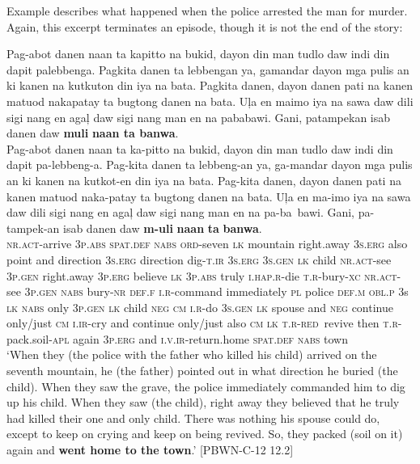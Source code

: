 Example  describes what happened when the police arrested the man for murder. Again, this excerpt terminates an episode, though it is not the end of the story:

\ea
\label{ex:tothetown}
Pag-abot danen naan ta kapitto na bukid, dayon din man tudlo daw indi din dapit palebbenga. Pagkita danen ta lebbengan ya, gamandar dayon mga pulis an ki kanen na kutkuton din iya na bata. Pagkita danen, dayon danen pati na kanen matuod nakapatay ta bugtong danen na bata. Uļa en maimo iya na sawa daw dili sigi nang en agaļ daw sigi nang man en na pababawi. Gani, patampekan isab danen daw \textbf{muli} \textbf{naan ta banwa}.\\\smallskip
\gll Pag-abot danen naan ta ka-pitto na bukid, dayon din man tudlo daw indi din dapit
pa-lebbeng-a. Pag-kita danen ta lebbeng-an ya, ga-mandar dayon mga pulis an ki kanen na
kutkot-en din iya na bata. Pag-kita danen, dayon danen pati na kanen matuod naka-patay ta
bugtong danen na bata. Uļa en ma-imo iya na sawa daw dili sigi nang en agaļ daw sigi nang man en na pa-ba~bawi. Gani, pa-tampek-an isab danen daw \textbf{m-uli} \textbf{naan}
\textbf{ta} \textbf{banwa}. \\
\textsc{nr.act}-arrive 3\textsc{p.abs} \textsc{spat.def} \textsc{nabs} \textsc{ord}-seven \textsc{lk} mountain right.away 3\textsc{s.erg} also point and direction 3\textsc{s.erg} direction
dig-\textsc{t.ir} 3\textsc{s.erg} 3\textsc{s.gen} \textsc{lk} child \textsc{nr.act}-see 3\textsc{p.gen} right.away 3\textsc{p.erg}  believe \textsc{lk} 3\textsc{p.abs} truly \textsc{i.hap.r}-die
\textsc{t.r}-bury-\textsc{xc} \textsc{nr.act}-see 3\textsc{p.gen} \textsc{nabs} bury-\textsc{nr} \textsc{def.f} \textsc{i.r}-command immediately \textsc{pl} police \textsc{def.m} \textsc{obl.p} 3s \textsc{lk}
\textsc{nabs} only 3\textsc{p.gen} \textsc{lk} child \textsc{neg} \textsc{cm} \textsc{i.r}-do 3\textsc{s.gen} \textsc{lk} spouse and \textsc{neg} continue only/just \textsc{cm} \textsc{i.ir}-cry and continue only/just also
\textsc{cm} \textsc{lk} \textsc{t.r}-\textsc{red}~revive then \textsc{t.r}-pack.soil-\textsc{apl} again 3\textsc{p.erg} and \textsc{i.v.ir}-return.home \textsc{spat.def} \textsc{nabs} town \\
\glt ‘When they (the police with the father who killed his child) arrived on the seventh mountain, he (the father) pointed out in what direction he buried (the child). When they saw the grave, the police immediately commanded him to dig up his child. When they saw (the child), right away they believed that he truly had killed their one and only child. There was nothing his spouse could do, except to keep on crying and keep on being revived. So, they packed (soil on it) again and \textbf{went home to the town}.’ [PBWN-C-12 12.2]
\z

